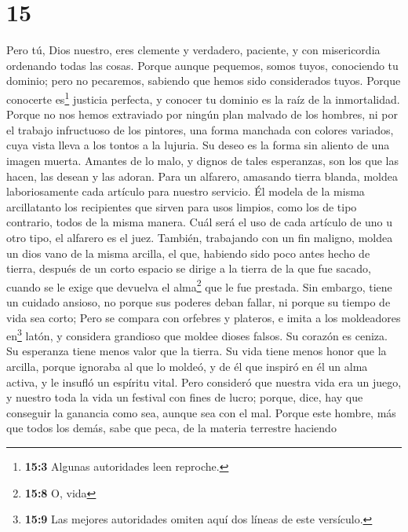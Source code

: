 \hypertarget{section-14}{%
\section{15}\label{section-14}}

 Pero tú, Dios nuestro, eres clemente y verdadero,
paciente, y con misericordia ordenando todas las cosas. 
Porque aunque pequemos, somos tuyos, conociendo tu dominio; pero no
pecaremos, sabiendo que hemos sido considerados tuyos. 
Porque conocerte es\footnote{\textbf{15:3} Algunas autoridades leen
  reproche.} justicia perfecta, y conocer tu dominio es la raíz de la
inmortalidad.  Porque no nos hemos extraviado por ningún
plan malvado de los hombres, ni por el trabajo infructuoso de los
pintores, una forma manchada con colores variados,  cuya
vista lleva a los tontos a la lujuria. Su deseo es la forma sin aliento
de una imagen muerta.  Amantes de lo malo, y dignos de
tales esperanzas, son los que las hacen, las desean y las adoran.
 Para un alfarero, amasando tierra blanda, moldea
laboriosamente cada artículo para nuestro servicio. Él modela de la
misma arcillatanto los recipientes que sirven para usos limpios, como
los de tipo contrario, todos de la misma manera. Cuál será el uso de
cada artículo de uno u otro tipo, el alfarero es el juez. 
También, trabajando con un fin maligno, moldea un dios vano de la misma
arcilla, el que, habiendo sido poco antes hecho de tierra, después de un
corto espacio se dirige a la tierra de la que fue sacado, cuando se le
exige que devuelva el alma\footnote{\textbf{15:8} O, vida} que le fue
prestada.  Sin embargo, tiene un cuidado ansioso, no
porque sus poderes deban fallar, ni porque su tiempo de vida sea corto;
Pero se compara con orfebres y plateros, e imita a los moldeadores
en\footnote{\textbf{15:9} Las mejores autoridades omiten aquí dos líneas
  de este versículo.} latón, y considera grandioso que moldee dioses
falsos.  Su corazón es ceniza. Su esperanza tiene menos
valor que la tierra. Su vida tiene menos honor que la arcilla,
 porque ignoraba al que lo moldeó, y de él que inspiró en
él un alma activa, y le insufló un espíritu vital.  Pero
consideró que nuestra vida era un juego, y nuestro toda la vida un
festival con fines de lucro; porque, dice, hay que conseguir la ganancia
como sea, aunque sea con el mal.  Porque este hombre, más
que todos los demás, sabe que peca, de la materia terrestre haciendo

